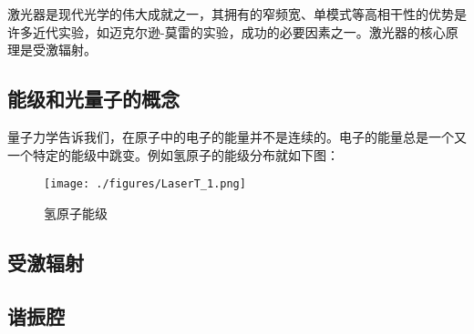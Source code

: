 
激光器是现代光学的伟大成就之一，其拥有的窄频宽、单模式等高相干性的优势是许多近代实验，如迈克尔逊-莫雷的实验，成功的必要因素之一。激光器的核心原理是受激辐射。

\subsection{能级和光量子的概念}
量子力学告诉我们，在原子中的电子的能量并不是连续的。电子的能量总是一个又一个特定的能级中跳变。例如氢原子的能级分布就如下图：\begin{figure}[ht]
\centering
\texttt{[image: ./figures/LaserT\_1.png]}
\caption{氢原子能级} \label{LaserT_fig1}
\end{figure}

\subsection{受激辐射}
\subsection{谐振腔}
